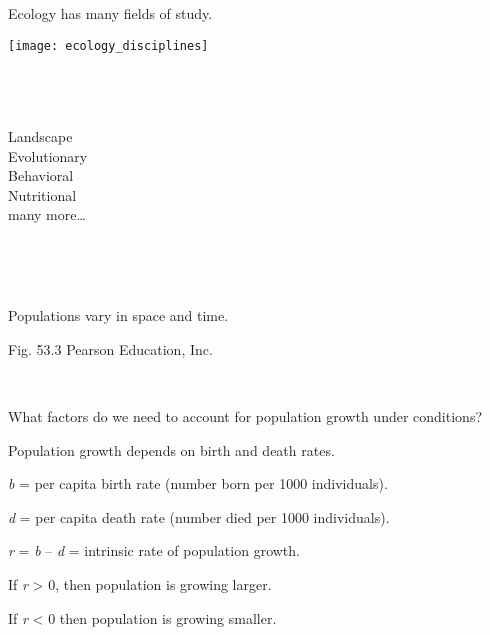 \documentclass[t,handout]{beamer}  %
\newcommand{\ccby}[1]{%
	\ifx&#1&
	{\textsc{cc by}}%
\else
	{\textsc{cc by #1.0}}
\fi}
\begin{document}
%
\begin{frame}[t]{Ecology has many fields of study.}
	\begin{minipage}[t]{0.6\textwidth}
		\vspace{0pt}
		\texttt{[image: ecology\_disciplines]}
	\end{minipage}
	\hfill
	\begin{minipage}[t]{0.3\textwidth}
		\vspace{0pt}
		\\
		\\
		\\
		Landscape\\
		Evolutionary\\
		Behavioral\\
		Nutritional\\
		many more\dots
	\end{minipage}	
\end{frame}
%
{
\begin{frame}[b]{\textcolor{white}{What is a population?}}

	\tiny\textcolor{white}{Spencer Wright, Flickr, \ccby{2}.}
\end{frame}
}
%
{
\begin{frame}[b]{Populations vary in space and time.}

	\hfill \tiny Fig. 53.3 \textcopyright Pearson Education, Inc.
\end{frame}
}
{
\begin{frame}[b]{\textcolor{white}{Meet \textit{Escherichia coli.}}}
\tiny \hfill \textcolor{white}{NIAID, National Institutes of Health, public domain.}%
\end{frame}
}

\begin{frame}{}

	\hangpara\Large What factors do we need to account for population growth under  conditions? 
	
\end{frame}


\begin{frame}{Population growth depends on birth and death rates.}

	\hangpara \textit{b} = per capita birth rate (number born per 1000 individuals). \pause
	
	\hangpara \textit{d} = per capita death rate (number died per 1000 individuals). \pause
	
	\hangpara \textit{r} = \textit{b} – \textit{d} = intrinsic rate of population growth. \pause
	
	\hangpara If \textit{r} \textgreater{} 0, then population is growing larger.
	
	\hangpara If \textit{r} \textless{} 0 then population is growing smaller.
	
	
\end{frame}
\end{document}
